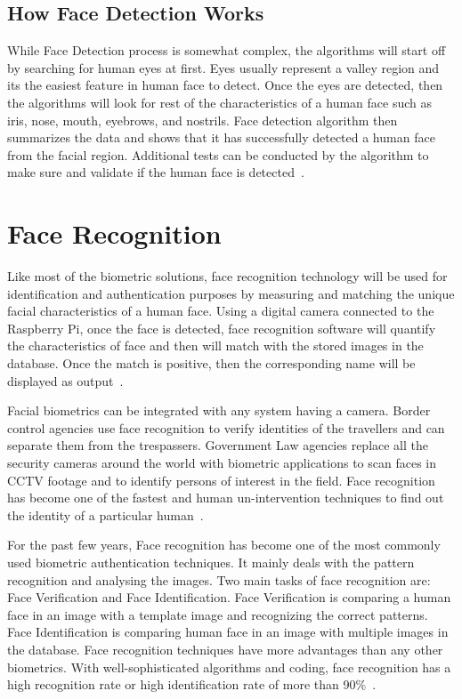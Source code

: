 \subsection{How Face Detection Works}
While Face Detection process is somewhat complex, the algorithms will start 
off by searching for human eyes at first. Eyes usually represent a valley 
region and its the easiest feature in human face to detect. Once the eyes 
are detected, then the algorithms will look for rest of the characteristics 
of a human face such as iris, nose, mouth, eyebrows, and nostrils. 
Face detection algorithm then summarizes the data and shows that it has 
successfully detected a human face from the facial region. Additional tests 
can be conducted by the algorithm to make sure and validate if the human face 
is detected~\cite{jesse2017}.

\section{Face Recognition}
Like most of the biometric solutions, face recognition technology will be 
used for identification and authentication purposes by measuring and matching 
the unique facial characteristics of a human face. Using a digital camera 
connected to the Raspberry Pi, once the face is detected, face recognition 
software will quantify the characteristics of face and then will match with 
the stored images in the database. Once the match is positive, then the 
corresponding name will be displayed as output~\cite{biometrics2016}.

Facial biometrics can be integrated with any system having a camera. Border 
control agencies use face recognition to verify identities of the travellers 
and can separate them from the trespassers. Government Law agencies replace 
all the security cameras around the world with biometric applications to scan 
faces in CCTV footage and to identify persons of interest in the field. Face 
recognition has become one of the fastest and human un-intervention techniques 
to find out the identity of a particular human~\cite{biometrics2016}.

For the past few years, Face recognition has become one of the most commonly 
used biometric authentication techniques. It mainly deals with the pattern 
recognition and analysing the images. Two main tasks of face recognition 
are: Face Verification and Face Identification. Face Verification is 
comparing a human face in an image with a template image and recognizing 
the correct patterns. Face Identification is comparing human face in an 
image with multiple images in the database. Face recognition techniques 
have more advantages than any other biometrics. With well-sophisticated 
algorithms and coding, face recognition has a high recognition rate or high 
identification rate of more than 90\%~\cite{riddhi2013}.

